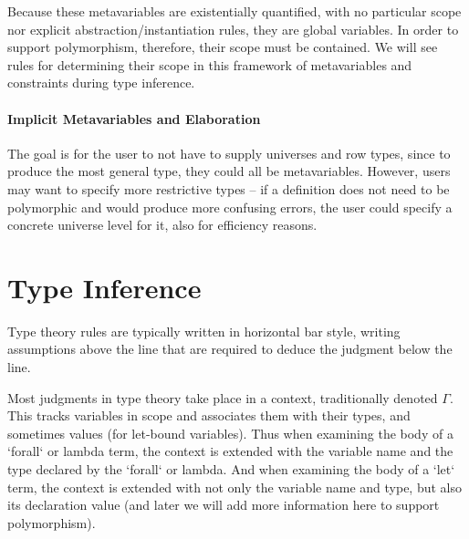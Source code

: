 \documentclass[11pt, twoside, reqno]{book}
\begin{document}
Because these metavariables are existentially quantified, with no particular scope nor explicit abstraction/instantiation rules, they are global variables.
In order to support polymorphism, therefore, their scope must be contained.
We will see rules for determining their scope in this framework of metavariables and constraints during type inference.

\subsubsection{Implicit Metavariables and Elaboration}
The goal is for the user to not have to supply universes and row types, since to produce the most general type, they could all be metavariables.
However, users may want to specify more restrictive types -- if a definition does not need to be polymorphic and would produce more confusing errors, the user could specify a concrete universe level for it, also for efficiency reasons.

\iffalse
\section{Model Theory}

Delicate dance of level-mixing.

Note that there is an ordering induced by the monoid operation on the normal forms.
This ordering will be very useful, in particular in obtaining normal forms for expressions impredicative-maximum, but it does not reveal everything about how two expressions relate.
Also note that it is a partial order, since variables in the universe level expressions are not yet assigned to values -- while internally in the theory, levels would be totally ordered since they correspond to natural numbers (once variables are assigned values).
\fi


\chapter{Type Inference}
\label{type-inf}

Type theory rules are typically written in horizontal bar style, writing assumptions above the line that are required to deduce the judgment below the line.

Most judgments in type theory take place in a context, traditionally denoted \(\Gamma\).
This tracks variables in scope and associates them with their types, and sometimes values (for let-bound variables).
Thus when examining the body of a \inHS`forall` or lambda term, the context is extended with the variable name and the type declared by the \inHS`forall` or lambda.
And when examining the body of a \inHS`let` term, the context is extended with not only the variable name and type, but also its declaration value (and later we will add more information here to support polymorphism).
\end{document}

